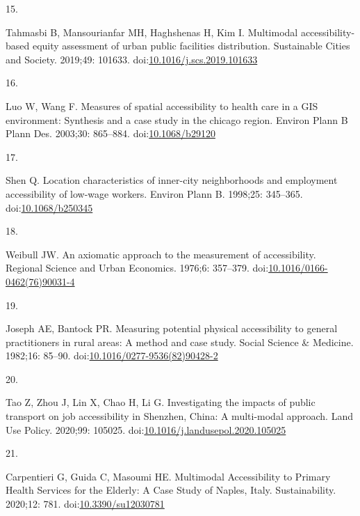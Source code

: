 \documentclass[10pt,letterpaper]{article}
\newlength{\cslhangindent}
\newlength{\csllabelwidth}
\newlength{\cslentryspacingunit} %
\newenvironment{CSLReferences}[2] %
 {%
  \setlength{\parindent}{0pt}
  \ifodd #1
  \let\oldpar\par
  \def\par{\hangindent=\cslhangindent\oldpar}
  \fi
  \setlength{\parskip}{#2\cslentryspacingunit}
 }%
 {}
\newcommand{\CSLLeftMargin}[1]{\parbox[t]{\csllabelwidth}{#1}}
\newcommand{\CSLRightInline}[1]{\parbox[t]{\linewidth - \csllabelwidth}{#1}\break}
\begin{document}
\begin{CSLReferences}{0}{0}
\leavevmode{}%
\CSLLeftMargin{15. }%
\CSLRightInline{Tahmasbi B, Mansourianfar MH, Haghshenas H, Kim I.
Multimodal accessibility-based equity assessment of urban public
facilities distribution. Sustainable Cities and Society. 2019;49:
101633.
doi:\href{https://doi.org/10.1016/j.scs.2019.101633}{10.1016/j.scs.2019.101633}}

\leavevmode{}%
\CSLLeftMargin{16. }%
\CSLRightInline{Luo W, Wang F. Measures of spatial accessibility to
health care in a {GIS} environment: Synthesis and a case study in the
chicago region. Environ Plann B Plann Des. 2003;30: 865--884.
doi:\href{https://doi.org/10.1068/b29120}{10.1068/b29120}}

\leavevmode{}%
\CSLLeftMargin{17. }%
\CSLRightInline{Shen Q. Location characteristics of inner-city
neighborhoods and employment accessibility of low-wage workers. Environ
Plann B. 1998;25: 345--365.
doi:\href{https://doi.org/10.1068/b250345}{10.1068/b250345}}

\leavevmode{}%
\CSLLeftMargin{18. }%
\CSLRightInline{Weibull JW. An axiomatic approach to the measurement of
accessibility. Regional Science and Urban Economics. 1976;6: 357--379.
doi:\href{https://doi.org/10.1016/0166-0462(76)90031-4}{10.1016/0166-0462(76)90031-4}}

\leavevmode{}%
\CSLLeftMargin{19. }%
\CSLRightInline{Joseph AE, Bantock PR. Measuring potential physical
accessibility to general practitioners in rural areas: A method and case
study. Social Science \& Medicine. 1982;16: 85--90.
doi:\href{https://doi.org/10.1016/0277-9536(82)90428-2}{10.1016/0277-9536(82)90428-2}}

\leavevmode{}%
\CSLLeftMargin{20. }%
\CSLRightInline{Tao Z, Zhou J, Lin X, Chao H, Li G. Investigating the
impacts of public transport on job accessibility in {Shenzhen}, {China}:
A multi-modal approach. Land Use Policy. 2020;99: 105025.
doi:\href{https://doi.org/10.1016/j.landusepol.2020.105025}{10.1016/j.landusepol.2020.105025}}

\leavevmode{}%
\CSLLeftMargin{21. }%
\CSLRightInline{Carpentieri G, Guida C, Masoumi HE. Multimodal
{Accessibility} to {Primary Health Services} for the {Elderly}: {A Case
Study} of {Naples}, {Italy}. Sustainability. 2020;12: 781.
doi:\href{https://doi.org/10.3390/su12030781}{10.3390/su12030781}}


\end{CSLReferences}
\end{document}
